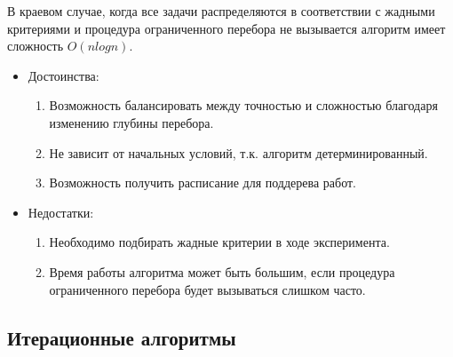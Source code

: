 В краевом случае, когда все задачи распределяются в соответствии с жадными критериями и процедура ограниченного перебора не вызывается алгоритм имеет сложность $O(nlogn)$.

\begin{itemize}
    \item Достоинства:
          \begin{enumerate}
              \item Возможность балансировать между точностью и сложностью благодаря изменению глубины перебора.
              \item Не зависит от начальных условий, т.к. алгоритм детерминированный.
              \item Возможность получить расписание для поддерева работ.
          \end{enumerate}


    \item Недостатки:
          \begin{enumerate}
              \item Необходимо подбирать жадные критерии в ходе эксперимента.
              \item Время работы алгоритма может быть большим, если процедура ограниченного перебора будет вызываться слишком часто.
          \end{enumerate}
\end{itemize}

\subsection{Итерационные алгоритмы}


